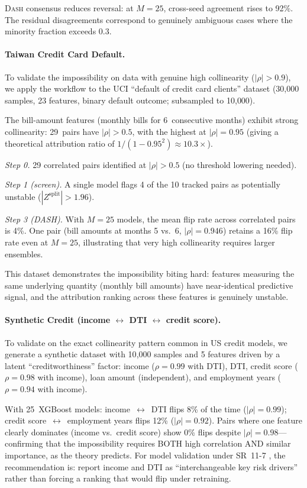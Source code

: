 \documentclass{article}
\newcommand{\DASH}{\textsc{Dash}}
\begin{document}
\DASH{} consensus reduces reversal: at $M = 25$, cross-seed agreement rises to 92\%. The residual disagreements correspond to genuinely ambiguous cases where the minority fraction exceeds 0.3.

\paragraph{Taiwan Credit Card Default.}
To validate the impossibility on data with genuine high collinearity
($|\rho| > 0.9$), we apply the workflow to the UCI ``default of credit
card clients'' dataset (30{,}000 samples, 23 features, binary default
outcome; subsampled to 10{,}000).

The bill-amount features (monthly bills for 6~consecutive months)
exhibit strong collinearity: 29~pairs have $|\rho| > 0.5$, with the
highest at $|\rho| = 0.95$ (giving a theoretical attribution ratio of
$1/(1{-}0.95^2) \approx 10.3\times$).

\emph{Step 0.} 29 correlated pairs identified at $|\rho| > 0.5$
(no threshold lowering needed).

\emph{Step 1 (screen).} A single model flags 4 of the 10 tracked pairs
as potentially unstable ($|Z^{\text{split}}| > 1.96$).

\emph{Step 3 (DASH).} With $M = 25$ models, the mean flip rate
across correlated pairs is 4\%. One pair (bill amounts at months 5
vs.\ 6, $|\rho| = 0.946$) retains a 16\% flip rate even at $M = 25$,
illustrating that very high collinearity requires larger ensembles.

This dataset demonstrates the impossibility biting hard: features
measuring the same underlying quantity (monthly bill amounts) have
near-identical predictive signal, and the attribution ranking across
these features is genuinely unstable.

\paragraph{Synthetic Credit (income $\leftrightarrow$ DTI $\leftrightarrow$ credit score).}
To validate on the exact collinearity pattern common in US credit
models, we generate a synthetic dataset with 10{,}000 samples and
5 features driven by a latent ``creditworthiness'' factor:
income ($\rho = 0.99$ with DTI), DTI, credit score ($\rho = 0.98$
with income), loan amount (independent), and employment years
($\rho = 0.94$ with income).

\begin{sloppypar}
With 25~XGBoost models: income~$\leftrightarrow$~DTI flips 8\%
of the time ($|\rho| = 0.99$); credit score~$\leftrightarrow$~employment
years flips 12\% ($|\rho| = 0.92$). Pairs where one feature clearly
dominates (income vs.\ credit score) show 0\% flips despite
$|\rho| = 0.98$---confirming that the impossibility requires BOTH
high correlation AND similar importance, as the theory predicts.
For model validation under SR~11-7 \citep{occ2011sr117}, the recommendation is:
report income and DTI as ``interchangeable key risk drivers'' rather than forcing
a ranking that would flip under retraining.
\end{sloppypar}
\end{document}
